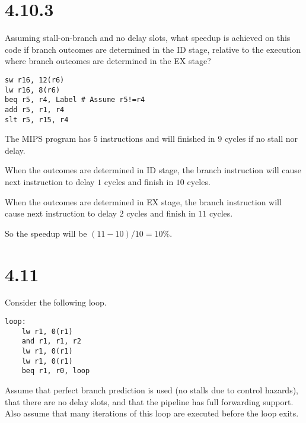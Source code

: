 \documentclass[paper=a4, fontsize=11pt]{scrartcl} %
\begin{document}
\maketitle %

\section{4.10.3}

\begin{fancyquotes}
    Assuming stall-on-branch and no delay slots, what speedup is achieved on this code if branch outcomes are determined in the ID stage, relative to the execution where branch outcomes are determined in the EX stage?
\end{fancyquotes}

\begin{lstlisting}[language={[mips]Assembler}]
sw r16, 12(r6)
lw r16, 8(r6)
beq r5, r4, Label # Assume r5!=r4
add r5, r1, r4
slt r5, r15, r4
\end{lstlisting}

The MIPS program has $5$ instructions and will finished in $9$ cycles if no stall nor delay.

When the outcomes are determined in ID stage, the branch instruction will cause next instruction to delay $1$ cycles and finish in $10$ cycles.

When the outcomes are determined in EX stage, the branch instruction will cause next instruction to delay $2$ cycles and finish in $11$ cycles.

So the speedup will be $(11-10)/10=10\%$.


\section{4.11}
\begin{fancyquotes}
    Consider the following loop.

\begin{lstlisting}[language={[mips]Assembler}]
loop:
    lw r1, 0(r1)
    and r1, r1, r2
    lw r1, 0(r1)
    lw r1, 0(r1)
    beq r1, r0, loop
\end{lstlisting}

    Assume that perfect branch prediction is used (no stalls due to control hazards), that there are no delay slots, and that the pipeline has full forwarding support. Also assume that many iterations of this loop are executed before the loop exits.
\end{fancyquotes}
\end{document}
